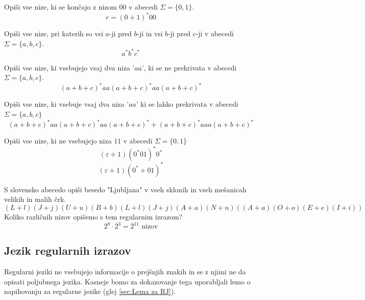 \documentclass[10pt,a4paper,oneside]{book}
\begin{document}
\begin{primeri}
\item Opiši vse nize, ki se končajo z nizom $00$ v abecedi $\Sigma = \{ 0,1 \}$.
	\begin{displaymath}
	r = (0+1)^*00
	\end{displaymath}
	\item Opiši vse nize, pri katerih so vsi $a$-ji pred $b$-ji in vsi $b$-ji pred $c$-ji v abecedi $\Sigma = \lbrace a,b,c \rbrace$.
		\begin{displaymath}
		a^*b^*c^*
		\end{displaymath}
	\item Opiši vse nize, ki vsebujejo vsaj dva niza '$aa$', ki se ne prekrivata v abecedi $\Sigma = \lbrace a,b,c \rbrace$.
		\begin{displaymath}
		(a+b+c)^* aa (a+b+c)^* aa (a+b+c)^* 
		\end{displaymath}
	\item Opiši vse nize, ki vsebuje vsaj dva niza '$aa$' ki se lahko prekrivata v abecedi $\Sigma = \lbrace a,b,c \rbrace$
		\begin{displaymath}
		(a+b+c)^* aa (a+b+c)^* aa (a+b+c)^* + (a+b+c)^* aaa (a+b+c)^* 
		\end{displaymath}
	\item Opiši vse nize, ki ne vsebujejo niza $11$ v abecedi $\Sigma = \lbrace 0,1 \rbrace$
		\begin{displaymath} 
		(\varepsilon  + 1 )(0^*01)^* 0^*
		\end{displaymath} 
		\begin{displaymath} 
		(\varepsilon  + 1 )(0^* + 01)^*
		\end{displaymath} 
	\item S slovensko abecedo opiši besedo "Ljubljana" v vseh sklonih in vseh mešanicah velikih in malih črk.
		\begin{displaymath}
		(L+l) (J+j) (U+u) (B+b) (L+l) (J+j) (A+a) (N+n) \left( (A+a)(O+o)(E+e)(I+i) \right) 
		\end{displaymath}
		Koliko različnih nizov opišemo s tem regularnim izrazom?\\
		\begin{displaymath}
		2^8 \cdot 2^3 = 2^{11} \mbox{ nizov}
		\end{displaymath}
\end{primeri}
\subsection{Jezik regularnih izrazov}
Regularni jeziki ne vsebujejo informacije o prejšnjih znakih in se z njimi ne da opisati poljubnega jezika. Kasneje bomo za dokazovanje tega uporabljali lemo o napihovanju za regularne jezike (glej \ref{sec:Lema za RJ}).
\end{document}
